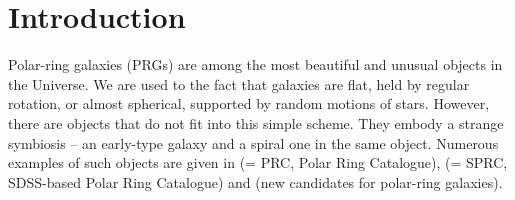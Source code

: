 \documentclass{raa}
\begin{document}
   \maketitle

%
%
\section{Introduction}           %
\label{sect:intro}
Polar-ring galaxies (PRGs) are among the most beautiful and unusual objects 
in the Universe. We are used to the fact that galaxies are flat, held by 
regular rotation, or almost spherical, supported by random motions of stars.
However, there are objects that do not fit into this simple scheme.
They embody a strange symbiosis -- an early-type galaxy and a spiral one in 
the same object. Numerous examples of such objects are given in
\cite{whit1990} (= PRC, Polar Ring Catalogue), \cite{moiseev2011} (= SPRC, SDSS-based Polar Ring Catalogue) and 
\cite{rm2019} (new candidates for polar-ring galaxies).
\end{document}
